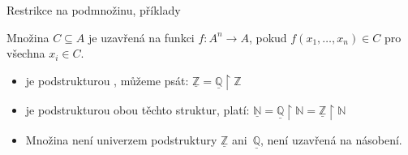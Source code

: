 \documentclass{beamer}
\begin{document}
\begin{frame}{Restrikce na podmnožinu, příklady}
    
    \pause
    Množina $C\subseteq A$ je \alert{uzavřená} na funkci $f:A^n\to A$, pokud $f(x_1,\dots,x_n)\in C$ pro všechna $x_i\in C$.

    \medskip

    \pause

    \medskip
    
    \pause
    \begin{itemize}
        \item {} je podstrukturou , můžeme psát: \alert{$\underline{\mathbb Z}=\underline{\mathbb Q}\restriction\mathbb Z$}\pause
        \item {} je podstrukturou obou těchto struktur, platí: \alert{$\underline{\mathbb N}=\underline{\mathbb Q}\restriction\mathbb N=\underline{\mathbb Z}\restriction\mathbb N$}\pause
        \item Množina  není univerzem podstruktury $\underline{\mathbb Z}$ ani~$\underline{\mathbb Q}$, není uzavřená na násobení.
    \end{itemize}

\end{frame}
\end{document}
